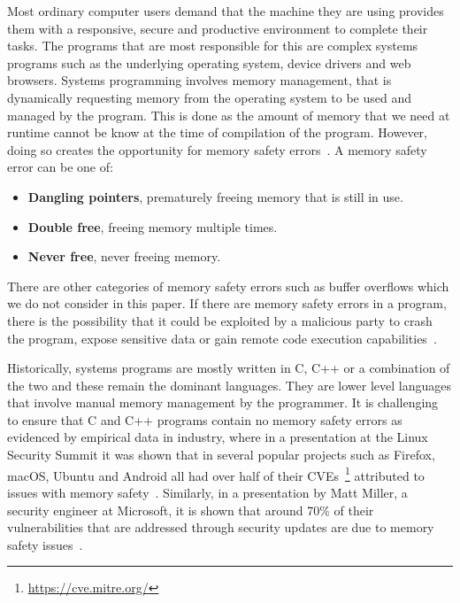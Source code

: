 \documentclass{mpaper}
\begin{document}
    Most ordinary computer users demand that the machine they are using provides them with a responsive, secure and productive environment to complete their tasks.
    The programs that are most responsible for this are complex systems programs such as the underlying operating system, device drivers and web browsers.
    Systems programming involves memory management, that is dynamically requesting memory from the operating system to be used and managed by the program.
    This is done as the amount of memory that we need at runtime cannot be know at the time of compilation of the program.
    However, doing so creates the opportunity for memory safety errors~\cite{Dhurjati2003}.
    A memory safety error can be one of:
    \begin{itemize}
        \item \textbf{Dangling pointers}, prematurely freeing memory that is still in use.
        \item \textbf{Double free}, freeing memory multiple times.
        \item \textbf{Never free}, never freeing memory.
    \end{itemize}
    There are other categories of memory safety errors such as buffer overflows which we do not consider in this paper.
    If there are memory safety errors in a program, there is the possibility that it could be exploited by a malicious party to crash the program, expose sensitive data or gain remote code execution capabilities~\cite{Afek2007}.

    Historically, systems programs are mostly written in C, C++ or a combination of the two and these remain the dominant languages.
    They are lower level languages that involve manual memory management by the programmer.
    It is challenging to ensure that C and C++ programs contain no memory safety errors as evidenced by empirical data in industry, where in a presentation at the Linux Security Summit it was shown that in several popular projects such as Firefox, macOS, Ubuntu and Android all had over half of their CVEs~\footnote{\url{https://cve.mitre.org/}} attributed to issues with memory safety~\cite{Gaynor2020}.
    Similarly, in a presentation by Matt Miller, a security engineer at Microsoft, it is shown that around 70\% of their vulnerabilities that are addressed through security updates are due to memory safety issues~\cite{Miller2019}. 
    
\end{document}
